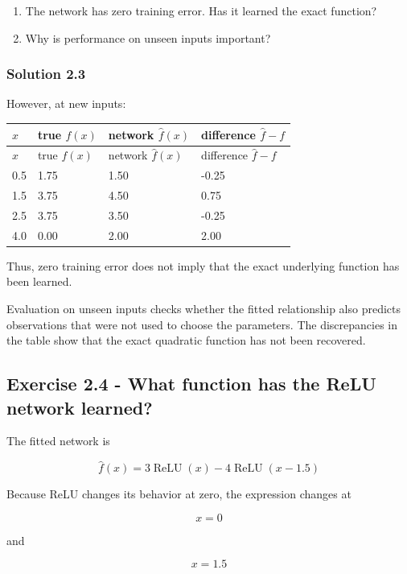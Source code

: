 \documentclass[10pt]{article}
\begin{document}
\begin{enumerate}
\item
The network has zero training error. Has it learned the exact function?

\item
Why is performance on unseen inputs important?

\end{enumerate}
\begingroup\color{red}

\subsubsection*{Solution 2.3}
However, at new inputs:

\begingroup
\small
\setlength{\tabcolsep}{4pt}
\begin{longtable}{l|l|l|l}
$x$ & true $f(x)$ & network $\hat f(x)$ & difference $\hat f-f$ \\[1.5pt]
\hline
\endfirsthead
$x$ & true $f(x)$ & network $\hat f(x)$ & difference $\hat f-f$ \\[1.5pt]
\hline
\endhead
0.5 & 1.75 & 1.50 & -0.25 \\[1.5pt]
1.5 & 3.75 & 4.50 & 0.75 \\[1.5pt]
2.5 & 3.75 & 3.50 & -0.25 \\[1.5pt]
4.0 & 0.00 & 2.00 & 2.00 \\[1.5pt]
\end{longtable}
\endgroup
Thus, zero training error does not imply that the exact underlying function has been learned.


Evaluation on unseen inputs checks whether the fitted relationship also predicts observations that were not used to choose the parameters. The discrepancies in the table show that the exact quadratic function has not been recovered.
\par\endgroup

\subsection*{Exercise 2.4 - What function has the ReLU network learned?}
The fitted network is

\[
\hat f(x)=3\operatorname{ReLU}(x)-4\operatorname{ReLU}(x-1.5)
\]

Because ReLU changes its behavior at zero, the expression changes at

\[
x=0
\]

and

\[
x=1.5
\]
\end{document}
